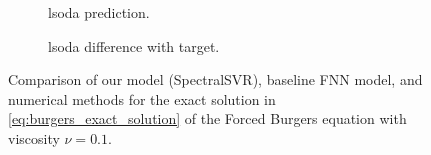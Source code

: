 \documentclass[preprint,12pt,times,authoryear]{elsarticle}
\begin{document}
\begin{figure}[hbp]
\begin{adjustwidth}{-0.05\linewidth}{-0.05\linewidth}
\begin{subfigure}{0.49\linewidth}
      \begin{adjustbox}{width=\linewidth}
        
      \end{adjustbox}
      \caption{lsoda prediction.}\label{fig:comp_exact_spo_pred_0.1}
    \end{subfigure}
    \begin{subfigure}{0.49\linewidth}
      \begin{adjustbox}{width=\linewidth}
        
      \end{adjustbox}
      \caption{lsoda difference with target.}\label{fig:comp_exact_spo_diff_0.1}
    \end{subfigure}
  \end{adjustwidth}
  \caption{Comparison of our model (SpectralSVR), baseline FNN model, and numerical methods for the exact solution in \cref{eq:burgers_exact_solution} of the Forced Burgers equation with viscosity \(\nu=0.1\).}\label{fig:comparison_burgers_exact_0.1}
\end{figure}
\end{document}
